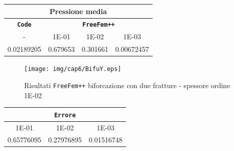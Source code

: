 \begin{center}
\begin{tabular}{|c|c|c|c|}
\hline
\multicolumn{4}{|c|}{Pressione media} \\
\hline
\textbf{\texttt{Code}} & \multicolumn{3}{|c|}{\textbf{\texttt{FreeFem++}}} \\
\hline
- & \multicolumn{1}{|c|}{1E-01} & 1E-02 & 1E-03 \\
\hline
0.02189205 & 0.679653 & 0.301661 & 0.00672457 \\
\hline
\end{tabular}
\end{center}

\begin{figure}[h!]
\centering
\texttt{[image: img/cap6/BifuY.eps]}
\caption{Risultati \texttt{FreeFem++} biforcazione con due fratture - spessore ordine 1E-02 }\label{Biforcazione2Frat1E-02}
\end{figure}

\begin{center}
\begin{tabular}{|c|c|c|}
\hline
  \multicolumn{3}{|c|}{\textbf{\texttt{Errore}}} \\ 
\hline
\multicolumn{1}{|c|}{1E-01} & 1E-02 & 1E-03 \\
\hline
0.65776095 & 0.27976895 & 0.01516748 \\
\hline
\end{tabular}
\end{center}